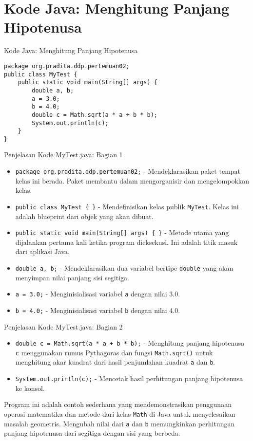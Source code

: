 \documentclass[aspectratio=169, table]{beamer}
\begin{document}
\section{Kode Java: Menghitung Panjang Hipotenusa}

\begin{frame}[fragile]{Kode Java: Menghitung Panjang Hipotenusa}
\begin{lstlisting}[style=JavaStyle, caption={Kode Java: MyTest.java}]
package org.pradita.ddp.pertemuan02;
public class MyTest {
	public static void main(String[] args) {
		double a, b;
		a = 3.0;
		b = 4.0;
		double c = Math.sqrt(a * a + b * b);
		System.out.println(c);
	}
}
\end{lstlisting}
\end{frame}

\begin{frame}[fragile]{Penjelasan Kode MyTest.java: Bagian 1}
\vspace{15pt}
\begin{itemize}
\item \texttt{package org.pradita.ddp.pertemuan02;} - Mendeklarasikan paket tempat kelas ini berada. Paket membantu dalam mengorganisir dan mengelompokkan kelas.
\item \texttt{public class MyTest \{ \}} - Mendefinisikan kelas publik \texttt{MyTest}. Kelas ini adalah blueprint dari objek yang akan dibuat.
\item \texttt{public static void main(String[] args) \{ \}} - Metode utama yang dijalankan pertama kali ketika program dieksekusi. Ini adalah titik masuk dari aplikasi Java.
\item \texttt{double a, b;} - Mendeklarasikan dua variabel bertipe \texttt{double} yang akan menyimpan nilai panjang sisi segitiga.
\item \texttt{a = 3.0;} - Menginisialisasi variabel \texttt{a} dengan nilai 3.0.
\item \texttt{b = 4.0;} - Menginisialisasi variabel \texttt{b} dengan nilai 4.0.
\end{itemize}
\end{frame}

\begin{frame}[fragile]{Penjelasan Kode MyTest.java: Bagian 2}
\begin{itemize}
\item \texttt{double c = Math.sqrt(a * a + b * b);} - Menghitung panjang hipotenusa \texttt{c} menggunakan rumus Pythagoras dan fungsi \texttt{Math.sqrt()} untuk menghitung akar kuadrat dari hasil penjumlahan kuadrat \texttt{a} dan \texttt{b}.
\item \texttt{System.out.println(c);} - Mencetak hasil perhitungan panjang hipotenusa ke konsol.
\end{itemize}
Program ini adalah contoh sederhana yang mendemonstrasikan penggunaan operasi matematika dan metode dari kelas \texttt{Math} di Java untuk menyelesaikan masalah geometris. Mengubah nilai dari \texttt{a} dan \texttt{b} memungkinkan perhitungan panjang hipotenusa dari segitiga dengan sisi yang berbeda.
\end{frame}
\end{document}
